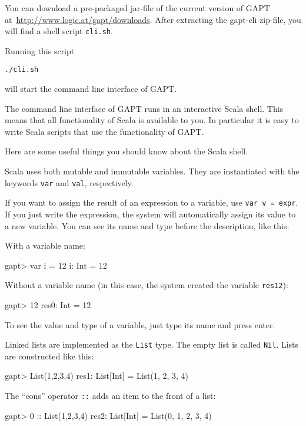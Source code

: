 \documentclass[a4paper,11pt]{article}
\begin{document}
You can download a pre-packaged jar-file of the current version of GAPT
at~\url{http://www.logic.at/gapt/downloads}. After extracting 
the gapt-cli zip-file, you will find a shell script \texttt{cli.sh}.

Running this script
\begin{lstlisting}[mathescape=false]
 ./cli.sh
\end{lstlisting}
will start the command line interface of GAPT.

The command line interface of GAPT runs in an interactive Scala shell. This
means that all functionality of Scala is available to you. In
particular it is easy to write Scala scripts that use the functionality of GAPT.

Here are some useful things you should know about the Scala shell.

Scala uses both mutable and immutable variables. They are instantiated
with the keywords \texttt{var} and \texttt{val}, respectively.

If you want to assign the result of an expression to a variable, use
\texttt{var v = expr}. If you just write the expression, the system will 
automatically assign its value to a new variable.
You can see its name and type before the description, like this:

With a variable name:

\begin{clilisting}
gapt> var i = 12
i: Int = 12

\end{clilisting}

Without a variable name (in this case, the system created the variable \texttt{res12}):

\begin{clilisting}
gapt> 12
res0: Int = 12

\end{clilisting}

To see the value and type of a variable, just type its name and press enter.

Linked lists are implemented as the \texttt{List} type. The empty list is called \texttt{Nil}.
Lists are constructed like this:
\begin{clilisting}
gapt> List(1,2,3,4)
res1: List[Int] = List(1, 2, 3, 4)

\end{clilisting}

The ``cons'' operator \texttt{::} adds an item to the front of a list:
\begin{clilisting}
gapt> 0 :: List(1,2,3,4)
res2: List[Int] = List(0, 1, 2, 3, 4)

\end{clilisting}
\end{document}
